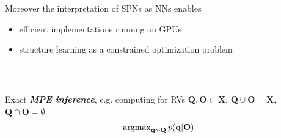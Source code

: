 \documentclass[xcolor={usenames,dvipsnames,svgnames}, compress]{beamer}
\newcommand{\argmax}{\operatornamewithlimits{argmax}}
\newcommand{\highlighttext}[2][yellow]{{\colorbox{#1}{\textcolor{white}{#2}}}}
\begin{document}
\begin{frame}[t]
    Moreover the interpretation of SPNs as NNs enables
    \begin{itemize}
      \setlength{\itemsep}{0pt}
    \item efficient implementations running on GPUs
    \item structure learning as a constrained optimization problem
      
    \end{itemize}
       
\end{frame}
  
\begin{frame}[t]
    \frametitle{\highlighttext[tomato3]{MPE inference with SPNs}}
    \footnotesize
    Exact \emph{\textbf{MPE inference}}, e.g. computing for RVs
    $\mathbf{Q},\mathbf{O}\subset\mathbf{X}$,
    $\mathbf{Q}\cup\mathbf{O}=\mathbf{X}$, 
    $\mathbf{Q}\cap\mathbf{O}=\emptyset$
    $$\argmax\nolimits_{\mathbf{q}\sim\mathbf{Q}}p(\mathbf{q}|\mathbf{O})$$
    

\end{frame}
\end{document}

